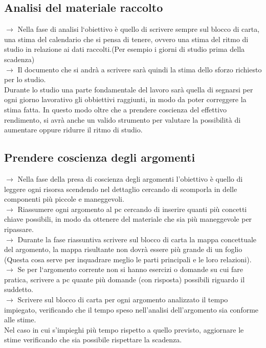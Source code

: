 \documentclass[11pt,a4paper]{article}
\begin{document}
\subsection{Analisi del materiale raccolto}
$\rightarrow$ Nella fase di analisi l`obiettivo è quello di scrivere sempre sul blocco di carta, una stima del calendario che si pensa di tenere, ovvero una stima del ritmo di studio in relazione ai dati raccolti.(Per esempio i giorni di studio prima della scadenza)\\
$\rightarrow$ Il documento che si andrà a scrivere sarà quindi la stima dello sforzo richiesto per lo studio.\\
 Durante lo studio una parte fondamentale del lavoro sarà quella di segnarsi per ogni giorno lavorativo gli obbiettivi raggiunti, in modo da poter correggere la stima fatta. In questo modo oltre che a prendere coscienza del effettivo rendimento, si avrà anche un valido strumento per valutare la possibilità di aumentare oppure ridurre il ritmo di studio.\\

\subsection{Prendere coscienza degli argomenti}
$\rightarrow$ Nella fase della presa di coscienza degli argomenti l'obiettivo è quello di leggere ogni risorsa scendendo nel dettaglio cercando di scomporla in delle componenti più piccole e maneggevoli.\\
$\rightarrow$ Riassumere ogni argomento al pc cercando di inserire quanti più concetti chiave possibili, in modo da ottenere del materiale che sia più maneggevole per ripassare.\\
$\rightarrow$ Durante la fase riassuntiva scrivere sul blocco di carta la mappa concettuale del argomento, la mappa risultante non dovrà essere più grande di un foglio (Questa cosa serve per inquadrare meglio le parti principali e le loro relazioni).\\
$\rightarrow$ Se per l`argomento corrente non si hanno esercizi o domande su cui fare pratica, scrivere a pc quante più domande (con risposta) possibili riguardo il suddetto.\\
$\rightarrow$ Scrivere sul blocco di carta per ogni argomento analizzato il tempo impiegato, verificando che il tempo speso nell'analisi dell'argomento sia conforme alle stime.\\
 Nel caso in cui s'impieghi più tempo rispetto a quello previsto, aggiornare le stime verificando che sia possibile rispettare la scadenza.\\
\end{document}
